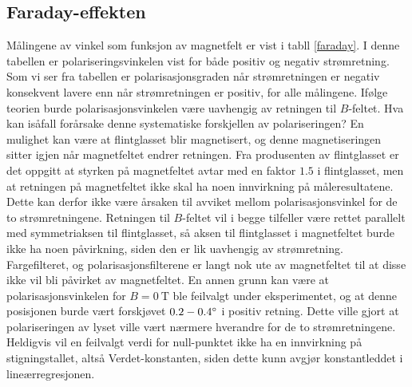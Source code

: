 \documentclass[%
 reprint,
 amsmath,amssymb,
 aps,
 norsk,
]{revtex4-1}
\begin{document}
\subsection{Faraday-effekten}
Målingene av vinkel som funksjon av magnetfelt er vist i tabll \vref{faraday}. I denne tabellen er polariseringsvinkelen vist for både positiv og negativ strømretning. Som vi ser fra tabellen er polarisasjonsgraden når strømretningen er negativ konsekvent lavere enn når strømretningen er positiv, for alle målingene. Ifølge teorien burde polarisasjonsvinkelen være uavhengig av retningen til $B$-feltet. Hva kan isåfall forårsake denne systematiske forskjellen av polariseringen? En mulighet kan være at flintglasset blir magnetisert, og denne magnetiseringen sitter igjen når magnetfeltet endrer retningen. Fra produsenten av flintglasset er det oppgitt at styrken på magnetfeltet avtar med en faktor $1.5$ i flintglasset, men at retningen på magnetfeltet ikke skal ha noen innvirkning på måleresultatene. Dette kan derfor ikke være årsaken til avviket mellom polarisasjonsvinkel for de to strømretningene. Retningen til $B$-feltet vil i begge tilfeller være rettet parallelt med symmetriaksen til flintglasset, så aksen til flintglasset i magnetfeltet burde ikke ha noen påvirkning, siden den er lik uavhengig av strømretning. Fargefilteret, og polarisasjonsfilterene er langt nok ute av magnetfeltet til at disse ikke vil bli påvirket av magnetfeltet. En annen grunn kan være at polarisasjonsvinkelen for $B=\SI{0}{\tesla}$ ble feilvalgt under eksperimentet, og at denne posisjonen burde vært forskjøvet $0.2-0.4\degree$ i positiv retning. Dette ville gjort at polariseringen av lyset ville vært nærmere hverandre for de to strømretningene. Heldigvis vil en feilvalgt verdi for null-punktet ikke ha en innvirkning på stigningstallet, altså Verdet-konstanten, siden dette kunn avgjør konstantleddet i lineærregresjonen.\par
\end{document}
